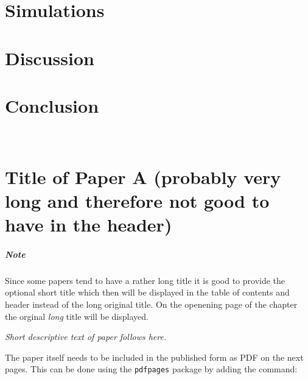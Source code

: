 \documentclass[%
]{USN-MSc}
\begin{document}
\chapter{Simulations}
\label{ch:simulations}


\chapter{Discussion}
\label{ch:discussion}


\chapter{Conclusion}
\label{ch:conclusion}


~\nocite{*}

\cleardoublepage

\printbibliography[heading=bibintoc]


\appendix


\chapter[Short Title of Paper A]{Title of Paper A (probably very long and therefore not good to have in the header)}
\label{paper-a}

\paragraph{Note}
Since some papers tend to have a rather long title it is good to provide the optional short title which then will be displayed in the table of contents and header instead of the long original title.
On the openening page of the chapter the orginal \emph{long} title will be displayed.\bigskip

\emph{Short descriptive text of paper follows here.}\bigskip

The paper itself needs to be included in the published form as PDF on the next pages.
This can be done using the \texttt{pdfpages} package by adding the command:
\end{document}
